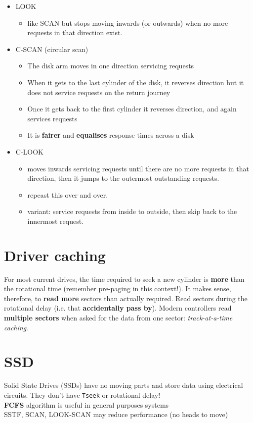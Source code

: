 \documentclass{article}
\begin{document}
\begin{itemize}
\begin{itemize}
\begin{itemize}
		\end{itemize}
	\end{itemize}
	\item LOOK
	\begin{itemize}
		\item like SCAN but stops moving inwards (or outwards) when no more requests in that direction exist.
	\end{itemize}
	\item C-SCAN (circular scan)
	\begin{itemize}
		\item The disk arm moves in one direction servicing requests
		\item When it gets to the last cylinder of the disk, it reverses direction but it does not service requests on the return journey
		\item Once it gets back to the first cylinder it reverses direction, and again services requests
		\item It is \textbf{fairer} and \textbf{equalises} response times across a disk
	\end{itemize}
	\item C-LOOK
	\begin{itemize}
		\item moves inwards servicing requests until there are no more requests in that direction, then it jumps to the outermost outstanding requests.
		\item repeast this over and over.
		\item variant: service requests from inside to outside, then skip back to the innermost request.
	\end{itemize}
\end{itemize}

\section{Driver caching}
\begin{flushleft}
For most current drives, the time required to seek a new cylinder is \textbf{more} than the rotational time (remember pre-paging in this context!). It makes sense, therefore, to \textbf{read more} sectors than actually required. Read sectors during the rotational delay (i.e. that \textbf{accidentally pass by}). Modern controllers read \textbf{multiple sectors} when asked for the data from one sector: \textit{track-at-a-time caching}.
\end{flushleft}

\section{SSD}
\begin{flushleft}
Solid State Drives (SSDs) have no moving parts and store data using electrical circuits. They don’t have \texttt{Tseek} or rotational delay!\\
\textbf{FCFS} algorithm is useful in general purposes systems\\
SSTF, SCAN, LOOK-SCAN may reduce performance (no heads to move)
\end{flushleft}
\end{document}
